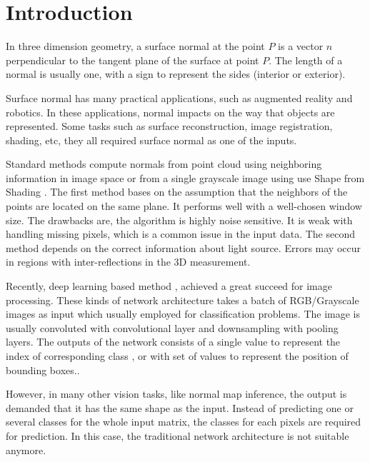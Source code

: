 
\section{Introduction}
In three dimension geometry, a surface normal at the point $ P $ is a vector $ n $ perpendicular to the tangent plane of the surface at point $ P $. The length of a normal is usually one, with a sign to represent the sides (interior or exterior).


Surface normal has many practical applications, such as augmented reality and robotics. In these applications, normal impacts on the way that objects are represented. Some tasks such as surface reconstruction, image registration, shading, etc, they all required surface normal as one of the inputs. 



Standard methods compute normals from point cloud using neighboring information in image space or from a single grayscale image using use Shape from Shading \cite{SFS}. The first method bases on the assumption that the neighbors of the points are located on the same plane. It performs well with a well-chosen window size. The drawbacks are, the algorithm is highly noise sensitive. It is weak with handling missing pixels, which is a common issue in the input data. The second method depends on the correct information about light source. Errors may occur in regions with inter-reflections in the 3D measurement. 

Recently, deep learning based method \cite{yolov3}, \cite{efficientDet} achieved a great succeed for image processing. 
These kinds of network architecture takes a batch of RGB/Grayscale images as input which usually employed for classification problems. The image is usually convoluted with convolutional layer and downsampling with pooling layers. The outputs of the network consists of a single value to represent the index of corresponding class \cite{efficientDet}, or with set of values to represent the position of bounding boxes.\cite{yolov3}. 

However, in many other vision tasks, like normal map inference, the output is demanded that it has the same shape as the input. Instead of predicting one or several classes for the whole input matrix, the classes for each pixels are required for prediction. In this case, the traditional network architecture is not suitable anymore.

